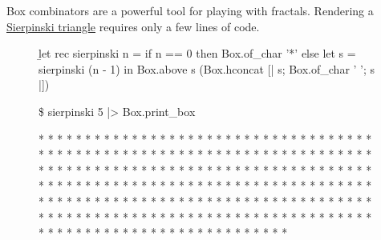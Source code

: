 \documentclass{article}
\begin{document}
Box combinators are a powerful tool for playing with fractals.
Rendering a \href{https://en.wikipedia.org/wiki/Sierpi%C5%84ski_triangle}{Sierpinski triangle} requires only a few lines of code.

\begin{figure}
\begin{code}[ocaml]
\b{let rec} sierpinski n =
    if n == 0 then Box.of_char '*'
    else let s = sierpinski (n - 1) in
         Box.above s (Box.hconcat [| s; Box.of_char ' '; s |])
\end{code}
\end{figure}

\begin{figure}
\begin{code}[text]
\$ sierpinski 5 |> Box.print_box

                               *
                              * *
                             *   *
                            * * * *
                           *       *
                          * *     * *
                         *   *   *   *
                        * * * * * * * *
                       *               *
                      * *             * *
                     *   *           *   *
                    * * * *         * * * *
                   *       *       *       *
                  * *     * *     * *     * *
                 *   *   *   *   *   *   *   *
                * * * * * * * * * * * * * * * *
               *                               *
              * *                             * *
             *   *                           *   *
            * * * *                         * * * *
           *       *                       *       *
          * *     * *                     * *     * *
         *   *   *   *                   *   *   *   *
        * * * * * * * *                 * * * * * * * *
       *               *               *               *
      * *             * *             * *             * *
     *   *           *   *           *   *           *   *
    * * * *         * * * *         * * * *         * * * *
   *       *       *       *       *       *       *       *
  * *     * *     * *     * *     * *     * *     * *     * *
 *   *   *   *   *   *   *   *   *   *   *   *   *   *   *   *
* * * * * * * * * * * * * * * * * * * * * * * * * * * * * * * *
\end{code}
\end{figure}
\end{document}
